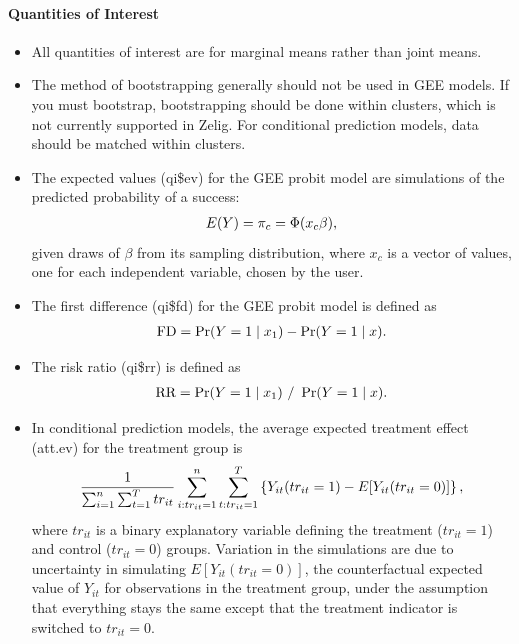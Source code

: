 \documentclass[letterpaper,10pt,english]{sphinxmanual}
\begin{document}
\paragraph{Quantities of Interest}
\label{zelig-probitgee:quantities-of-interest}\begin{itemize}
\item {} 
All quantities of interest are for marginal means rather than joint
means.

\item {} 
The method of bootstrapping generally should not be used in GEE
models. If you must bootstrap, bootstrapping should be done within
clusters, which is not currently supported in Zelig. For conditional
prediction models, data should be matched within clusters.

\item {} 
The expected values (qi\$ev) for the GEE probit model are simulations
of the predicted probability of a success:
\begin{gather}
\begin{split}E(Y) =
  \pi_{c}= \Phi(x_{c} \beta),\end{split}\notag
\end{gather}
given draws of \(\beta\) from its sampling distribution, where
\(x_{c}\) is a vector of values, one for each independent
variable, chosen by the user.

\item {} 
The first difference (qi\$fd) for the GEE probit model is defined as
\begin{gather}
\begin{split}\textrm{FD} = \Pr(Y = 1 \mid x_1) - \Pr(Y = 1 \mid x).\end{split}\notag
\end{gather}
\item {} 
The risk ratio (qi\$rr) is defined as
\begin{gather}
\begin{split}\textrm{RR} = \Pr(Y = 1 \mid x_1) \ / \ \Pr(Y = 1 \mid x).\end{split}\notag
\end{gather}
\item {} 
In conditional prediction models, the average expected treatment
effect (att.ev) for the treatment group is
\begin{gather}
\begin{split}\frac{1}{\sum_{i=1}^n \sum_{t=1}^T tr_{it}}\sum_{i:tr_{it}=1}^n \sum_{t:tr_{it}=1}^T \left\{ Y_{it}(tr_{it}=1) -
      E[Y_{it}(tr_{it}=0)] \right\},\end{split}\notag
\end{gather}
where \(tr_{it}\) is a binary explanatory variable defining the
treatment (\(tr_{it}=1\)) and control (\(tr_{it}=0\)) groups.
Variation in the simulations are due to uncertainty in simulating
\(E[Y_{it}(tr_{it}=0)]\), the counterfactual expected value of
\(Y_{it}\) for observations in the treatment group, under the
assumption that everything stays the same except that the treatment
indicator is switched to \(tr_{it}=0\).

\end{itemize}
\end{document}

